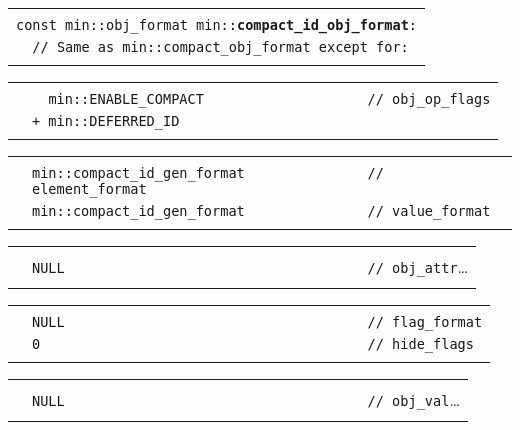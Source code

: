 \documentclass[12pt]{article}
\makeatletter
\newcommand{\TT}[1]{{\tt \bfseries #1}}
\newcommand{\ttindex}[1]{\index{#1@{\tt #1}}}
\newenvironment{indpar}[1][0.3in]%
	{\begin{list}{}%
		     {\setlength{\itemsep}{0in}%
		      \setlength{\topsep}{0in}%
		      \setlength{\parsep}{1ex}%
		      \setlength{\labelwidth}{#1}%
		      \setlength{\leftmargin}{#1}%
		      \addtolength{\leftmargin}{\labelsep}}%
	 \item}%
	{\end{list}}
\newcommand{\LABEL}[1]{\label{#1}}
\newlength{\ARGBREAKLENGTH}
\newcommand{\ARGBREAK}[1][\ARGBREAKLENGTH]{\\&\hspace*{#1}}
\newcommand{\MINKEY}[1]%
	   {\TT{#1}\ttindex{min::#1}\ttindex{#1}}
\makeatother
\begin{document}
\begin{indpar}[1em]

\begin{tabular}{r@{}l}\hspace*{0.1in} \\[-3ex]
\multicolumn{2}{l}{\tt const min::obj\_format
                   min::\MINKEY{compact\_id\_obj\_format}:}%
\LABEL{MIN::COMPACT_ID_OBJ_FORMAT}\ARGBREAK
\verb|// Same as min::compact_obj_format except for:|\ARGBREAK
\end{tabular}

\vspace{-4ex}\begin{tabular}{r@{}l}\hspace*{0.1in}\ARGBREAK
\verb|  min::ENABLE_COMPACT                    // obj_op_flags|\ARGBREAK
\verb|+ min::DEFERRED_ID|\ARGBREAK
\end{tabular}

\vspace{-4ex}\begin{tabular}{r@{}l}\hspace*{0.1in}\ARGBREAK
\verb|min::compact_id_gen_format               // element_format|\ARGBREAK
\verb|min::compact_id_gen_format               // value_format|\ARGBREAK
\end{tabular}

\vspace{-4ex}\begin{tabular}{r@{}l}\hspace*{0.1in}\ARGBREAK
\verb|NULL                                     // obj_attr|\ldots\ARGBREAK
\end{tabular}

\vspace{-4ex}\begin{tabular}{r@{}l}\hspace*{0.1in}\ARGBREAK
\verb|NULL                                     // flag_format|\ARGBREAK
\verb|0                                        // hide_flags|\ARGBREAK
\end{tabular}

\vspace{-4ex}\begin{tabular}{r@{}l}\hspace*{0.1in}\ARGBREAK
\verb|NULL                                     // obj_val|\ldots\ARGBREAK
\end{tabular}

\end{indpar}
\end{document}
